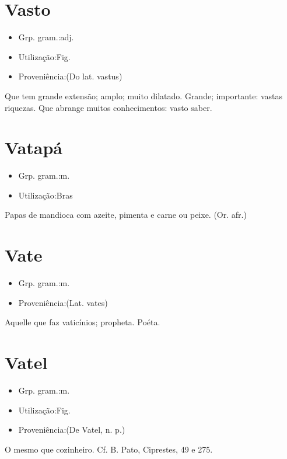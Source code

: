 \documentclass{article}
\begin{document}
\section{Vasto}
\begin{itemize}
\item {Grp. gram.:adj.}
\end{itemize}
\begin{itemize}
\item {Utilização:Fig.}
\end{itemize}
\begin{itemize}
\item {Proveniência:(Do lat. \textunderscore vastus\textunderscore )}
\end{itemize}
Que tem grande extensão; amplo; muito dilatado.
Grande; importante: \textunderscore vastas riquezas\textunderscore .
Que abrange muitos conhecimentos: \textunderscore vasto saber\textunderscore .
\section{Vatapá}
\begin{itemize}
\item {Grp. gram.:m.}
\end{itemize}
\begin{itemize}
\item {Utilização:Bras}
\end{itemize}
Papas de mandioca com azeite, pimenta e carne ou peixe.
(Or. afr.)
\section{Vate}
\begin{itemize}
\item {Grp. gram.:m.}
\end{itemize}
\begin{itemize}
\item {Proveniência:(Lat. \textunderscore vates\textunderscore )}
\end{itemize}
Aquelle que faz vaticínios; propheta.
Poéta.
\section{Vatel}
\begin{itemize}
\item {Grp. gram.:m.}
\end{itemize}
\begin{itemize}
\item {Utilização:Fig.}
\end{itemize}
\begin{itemize}
\item {Proveniência:(De \textunderscore Vatel\textunderscore , n. p.)}
\end{itemize}
O mesmo que \textunderscore cozinheiro\textunderscore . Cf. B. Pato, \textunderscore Ciprestes\textunderscore , 49 e 275.
\end{document}
